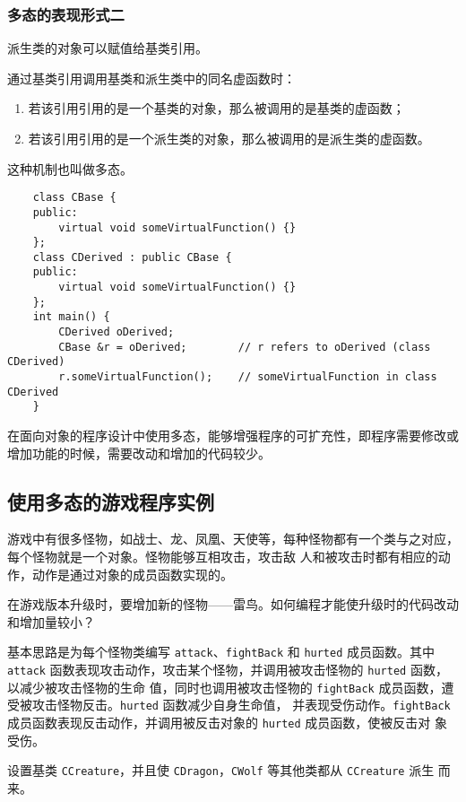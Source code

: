 \documentclass[UTF8]{ctexart}
\begin{document}
\subsubsection{多态的表现形式二}
派生类的对象可以赋值给基类引用。

通过基类引用调用基类和派生类中的同名虚函数时：
\begin{enumerate}
    \item 若该引用引用的是一个基类的对象，那么被调用的是基类的虚函数；
    \item 若该引用引用的是一个派生类的对象，那么被调用的是派生类的虚函数。
\end{enumerate}

这种机制也叫做多态。

\begin{verbatim}
    class CBase {
    public:
        virtual void someVirtualFunction() {}
    };
    class CDerived : public CBase {
    public:
        virtual void someVirtualFunction() {}
    };
    int main() {
        CDerived oDerived;
        CBase &r = oDerived;        // r refers to oDerived (class CDerived)
        r.someVirtualFunction();    // someVirtualFunction in class CDerived
    }
\end{verbatim}

在面向对象的程序设计中使用多态，能够增强程序的可扩充性，即程序需要修改或增加功能的时候，需要改动和增加的代码较少。

\subsection{使用多态的游戏程序实例}
游戏中有很多怪物，如战士、龙、凤凰、天使等，每种怪物都有一个类与之对应，每个怪物就是一个对象。怪物能够互相攻击，攻击敌
人和被攻击时都有相应的动作，动作是通过对象的成员函数实现的。

在游戏版本升级时，要增加新的怪物——雷鸟。如何编程才能使升级时的代码改动和增加量较小？

基本思路是为每个怪物类编写 \texttt{attack}、\texttt{fightBack} 和 \texttt{hurted} 成员函数。其中
\texttt{attack} 函数表现攻击动作，攻击某个怪物，并调用被攻击怪物的 \texttt{hurted} 函数，以减少被攻击怪物的生命
值，同时也调用被攻击怪物的 \texttt{fightBack} 成员函数，遭受被攻击怪物反击。\texttt{hurted} 函数减少自身生命值，
并表现受伤动作。\texttt{fightBack} 成员函数表现反击动作，并调用被反击对象的 \texttt{hurted} 成员函数，使被反击对
象受伤。

设置基类 \texttt{CCreature}，并且使 \texttt{CDragon}，\texttt{CWolf} 等其他类都从 \texttt{CCreature} 派生
而来。
\end{document}
